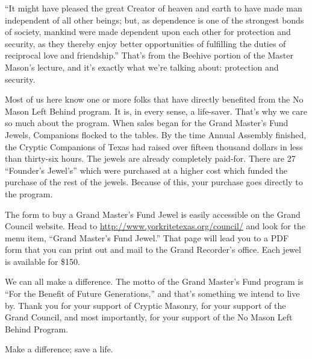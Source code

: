 \documentclass{article}
\begin{document}
	``It might have pleased the great Creator of heaven and earth to have made man independent of all other beings; but, as dependence is one of the strongest bonds of society, mankind were made dependent upon each other for protection and security, as they thereby enjoy better opportunities of fulfilling the duties of reciprocal love and friendship.'' That's from the Beehive portion of the Master Mason's lecture, and it's exactly what we're talking about: protection and security.
	
	Most of us here know one or more folks that have directly benefited from the No Mason Left Behind program. It is, in every sense, a life-saver. That's why we care so much about the program. When sales began for the Grand Master's Fund Jewels, Companions flocked to the tables. By the time Annual Assembly finished, the Cryptic Companions of Texas had raised over fifteen thousand dollars in less than thirty-six hours. The jewels are already completely paid-for. There are 27 ``Founder's Jewel's'' which were purchased at a higher cost which funded the purchase of the rest of the jewels. Because of this, your purchase goes directly to the program.  
	
	The form to buy a Grand Master's Fund Jewel is easily accessible on the Grand Council website.  Head to \url{http://www.yorkritetexas.org/council/} and look for the menu item, ``Grand Master's Fund Jewel.'' That page will lead you to a PDF form that you can print out and mail to the Grand Recorder's office. Each jewel is available for \$150.
	
	We can all make a difference. The motto of the Grand Master's Fund program is ``For the Benefit of Future Generations,'' and that's something we intend to live by. Thank you for your support of Cryptic Masonry, for your support of the Grand Council, and most importantly, for your support of the No Mason Left Behind Program.
	
	Make a difference; save a life.
\end{document}
